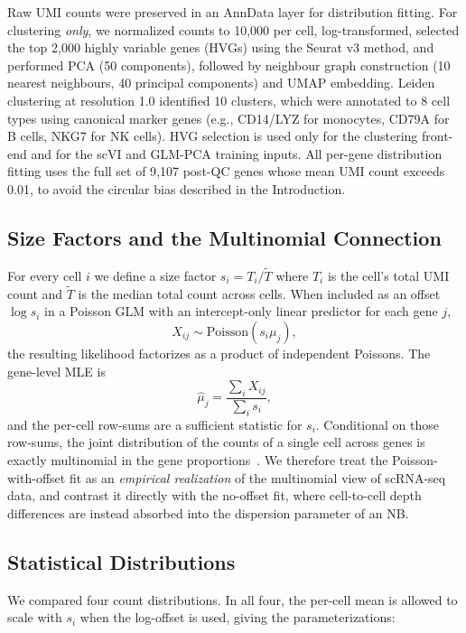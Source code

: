 \documentclass{article}
\begin{document}
Raw UMI counts were preserved in an AnnData layer for distribution fitting.
For clustering \emph{only}, we normalized counts to 10{,}000 per cell, log-transformed, selected the top 2{,}000 highly variable genes (HVGs) using the Seurat v3 method, and performed PCA (50 components), followed by neighbour graph construction (10 nearest neighbours, 40 principal components) and UMAP embedding.
Leiden clustering at resolution 1.0 identified 10 clusters, which were annotated to 8 cell types using canonical marker genes (e.g., CD14/LYZ for monocytes, CD79A for B cells, NKG7 for NK cells).
HVG selection is used only for the clustering front-end and for the scVI and GLM-PCA training inputs.
All per-gene distribution fitting uses the full set of 9{,}107 post-QC genes whose mean UMI count exceeds 0.01, to avoid the circular bias described in the Introduction.

\subsection{Size Factors and the Multinomial Connection}
\label{sec:sizefactors}

For every cell $i$ we define a size factor $s_i = T_i / \widetilde{T}$ where $T_i$ is the cell's total UMI count and $\widetilde T$ is the median total count across cells.
When included as an offset $\log s_i$ in a Poisson GLM with an intercept-only linear predictor for each gene $j$,
\[
X_{ij}\sim\text{Poisson}(s_i\mu_j),
\]
the resulting likelihood factorizes as a product of independent Poissons.
The gene-level MLE is
\[
\hat\mu_j = \frac{\sum_i X_{ij}}{\sum_i s_i},
\]
and the per-cell row-sums are a sufficient statistic for $s_i$.
Conditional on those row-sums, the joint distribution of the counts of a single cell across genes is exactly multinomial in the gene proportions~\cite{townes2019feature}.
We therefore treat the Poisson-with-offset fit as an \emph{empirical realization} of the multinomial view of scRNA-seq data, and contrast it directly with the no-offset fit, where cell-to-cell depth differences are instead absorbed into the dispersion parameter of an NB.

\subsection{Statistical Distributions}

We compared four count distributions. In all four, the per-cell mean is allowed to scale with $s_i$ when the log-offset is used, giving the parameterizations:
\end{document}
